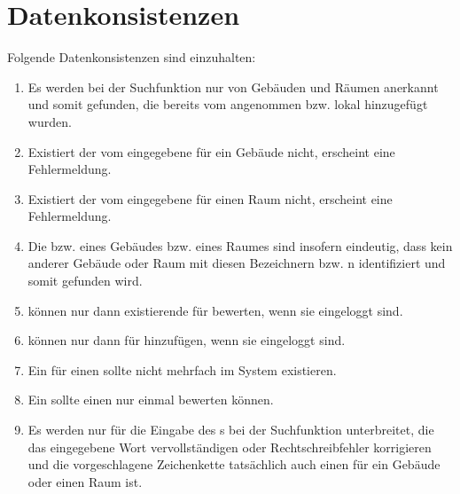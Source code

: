 \section{Datenkonsistenzen}

Folgende Datenkonsistenzen sind einzuhalten:
\begin{enumerate}[label=\textbf{/T\arabic*0/}, align=left, resume]
	\item Es werden bei der Suchfunktion nur %
		von Gebäuden und Räumen anerkannt und somit gefunden, die bereits vom %
		angenommen bzw. lokal hinzugefügt wurden.
	\item Existiert der vom %
		 eingegebene %
		 für ein Gebäude nicht, erscheint eine Fehlermeldung.
	\item Existiert der vom %
		 eingegebene %
		 für einen Raum nicht, erscheint eine Fehlermeldung.
	\item Die %
		bzw. %
		eines Gebäudes bzw. eines Raumes sind insofern eindeutig, dass kein anderer Gebäude oder Raum mit diesen Bezeichnern bzw. %
		n identifiziert und somit gefunden wird.
	\item %
		 können nur dann existierende %
		 für %
		bewerten, wenn sie eingeloggt sind.
	\item %
		 können nur dann %
		 für %
		hinzufügen, wenn sie eingeloggt sind.
	\item Ein %
		für einen %
		sollte nicht mehrfach im System existieren.
	\item Ein %
		sollte einen %
		nur einmal bewerten können.
	\item Es werden nur %
		für die Eingabe des %
		s bei der Suchfunktion unterbreitet, die das eingegebene Wort vervollständigen oder Rechtschreibfehler korrigieren und die vorgeschlagene Zeichenkette tatsächlich auch einen %
		für ein Gebäude oder einen Raum ist.
\end{enumerate}
